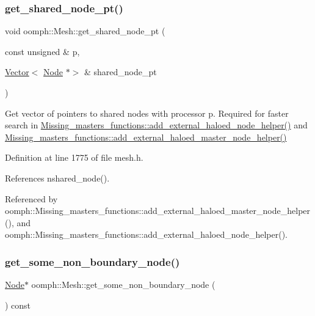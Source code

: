 \subsubsection{\texorpdfstring{get\+\_\+shared\+\_\+node\+\_\+pt()}{get\_shared\_node\_pt()}}
{\footnotesize\ttfamily void oomph\+::\+Mesh\+::get\+\_\+shared\+\_\+node\+\_\+pt (\begin{DoxyParamCaption}\item[{const unsigned \&}]{p,  }\item[{\hyperlink{classoomph_1_1Vector}{Vector}$<$ \hyperlink{classoomph_1_1Node}{Node} $\ast$$>$ \&}]{shared\+\_\+node\+\_\+pt }\end{DoxyParamCaption})\hspace{0.3cm}{\ttfamily [inline]}}



Get vector of pointers to shared nodes with processor p. Required for faster search in \hyperlink{namespaceoomph_1_1Missing__masters__functions_a6034e2c1c81a56272efd35886b2a9543}{Missing\+\_\+masters\+\_\+functions\+::add\+\_\+external\+\_\+haloed\+\_\+node\+\_\+helper()} and \hyperlink{namespaceoomph_1_1Missing__masters__functions_acd3ecd40c8ebcfdb04f2e26c3fc304cc}{Missing\+\_\+masters\+\_\+functions\+::add\+\_\+external\+\_\+haloed\+\_\+master\+\_\+node\+\_\+helper()} 



Definition at line 1775 of file mesh.\+h.



References nshared\+\_\+node().



Referenced by oomph\+::\+Missing\+\_\+masters\+\_\+functions\+::add\+\_\+external\+\_\+haloed\+\_\+master\+\_\+node\+\_\+helper(), and oomph\+::\+Missing\+\_\+masters\+\_\+functions\+::add\+\_\+external\+\_\+haloed\+\_\+node\+\_\+helper().

\mbox{\label{classoomph_1_1Mesh_ada7a88cfce20feae01e6841bf4375228}} 
\subsubsection{\texorpdfstring{get\+\_\+some\+\_\+non\+\_\+boundary\+\_\+node()}{get\_some\_non\_boundary\_node()}}
{\footnotesize\ttfamily \hyperlink{classoomph_1_1Node}{Node}$\ast$ oomph\+::\+Mesh\+::get\+\_\+some\+\_\+non\+\_\+boundary\+\_\+node (\begin{DoxyParamCaption}{ }\end{DoxyParamCaption}) const\hspace{0.3cm}{\ttfamily [inline]}}



